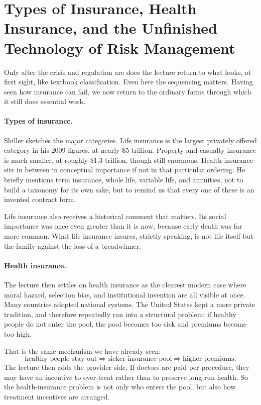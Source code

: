 \section{Types of Insurance, Health Insurance, and the Unfinished Technology of Risk Management}

Only after the crisis and regulation arc does the lecture return to what looks, at first sight, like textbook classification. Even here the sequencing matters. Having seen how insurance can fail, we now return to the ordinary forms through which it still does essential work.

\paragraph{Types of insurance.} Shiller sketches the major categories. Life insurance is the largest privately offered category in his 2009 figures, at nearly \$5 trillion. Property and casualty insurance is much smaller, at roughly \$1.3 trillion, though still enormous. Health insurance sits in between in conceptual importance if not in that particular ordering. He briefly mentions term insurance, whole life, variable life, and annuities, not to build a taxonomy for its own sake, but to remind us that every one of these is an invented contract form.

Life insurance also receives a historical comment that matters. Its social importance was once even greater than it is now, because early death was far more common. What life insurance insures, strictly speaking, is not life itself but the family against the loss of a breadwinner.

\paragraph{Health insurance.} The lecture then settles on health insurance as the clearest modern case where moral hazard, selection bias, and institutional invention are all visible at once. Many countries adopted national systems. The United States kept a more private tradition, and therefore repeatedly ran into a structural problem: if healthy people do not enter the pool, the pool becomes too sick and premiums become too high.

That is the same mechanism we have already seen:
\begin{equation}
\text{healthy people stay out} \Longrightarrow \text{sicker insurance pool} \Longrightarrow \text{higher premiums}.
\end{equation}
The lecture then adds the provider side. If doctors are paid per procedure, they may have an incentive to over-treat rather than to preserve long-run health. So the health-insurance problem is not only who enters the pool, but also how treatment incentives are arranged.

